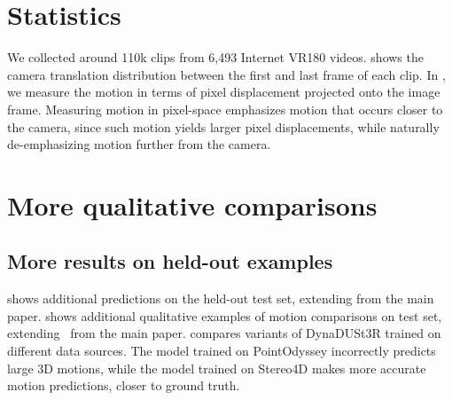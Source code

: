 \clearpage

\setcounter{page}{1}
\maketitlesupplementary


\section{\dataset Statistics}
We collected around 110k clips from 6,493 Internet VR180 videos.
 shows the camera translation distribution between the first and last frame of each clip. 
In , we measure the motion in terms of pixel displacement projected onto the image frame. Measuring motion in pixel-space emphasizes motion that occurs closer to the camera, since such motion yields larger pixel displacements, while naturally de-emphasizing motion further from the camera. 

\section{More qualitative comparisons}


\subsection{More results on held-out  \dataset examples}
 shows additional \method predictions on the \dataset held-out test set, extending  from the main paper.  shows additional qualitative examples of motion comparisons on \dataset test set, extending~ from the main paper.  compares variants of DynaDUSt3R trained on different data sources. The model trained on PointOdyssey incorrectly predicts large 3D motions, while the model trained on Stereo4D makes more accurate motion predictions, closer to ground truth.

